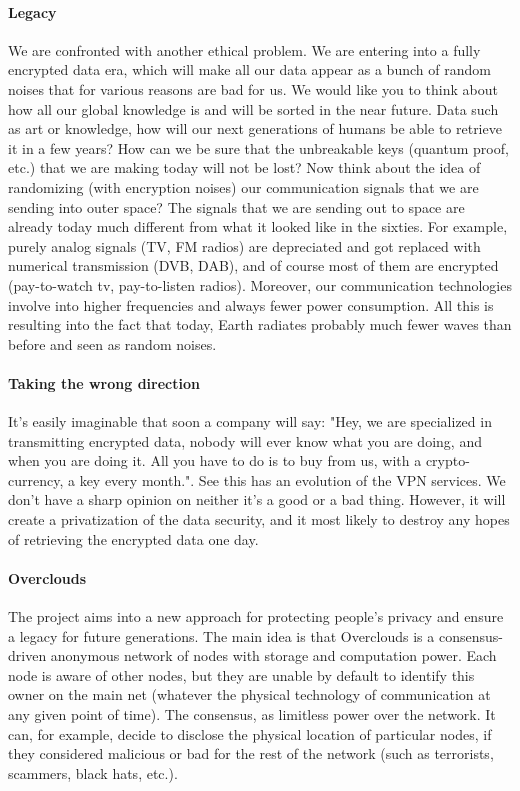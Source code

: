 \paragraph{Legacy} We are confronted with another ethical problem. We are entering into a fully encrypted data era, which will make all our data appear as a bunch of random noises that for various reasons are bad for us. We would like you to think about how all our global knowledge is and will be sorted in the near future. Data such as art or knowledge, how will our next generations of humans be able to retrieve it in a few years? How can we be sure that the unbreakable keys (quantum proof, etc.) that we are making today will not be lost?
Now think about the idea of randomizing (with encryption noises) our communication signals that we are sending into outer space? The signals that we are sending out to space are already today much different from what it looked like in the sixties. For example, purely analog signals (TV, FM radios) are depreciated and got replaced with numerical transmission (DVB, DAB), and of course most of them are encrypted (pay-to-watch tv, pay-to-listen radios). Moreover, our communication technologies involve into higher frequencies and always fewer power consumption. All this is resulting into the fact that today, Earth radiates probably much fewer waves than before and seen as random noises.

\paragraph{Taking the wrong direction} It's easily imaginable that soon a company will say: "Hey, we are specialized in transmitting encrypted data, nobody will ever know what you are doing, and when you are doing it. All you have to do is to buy from us, with a crypto-currency, a key every month.". See this has an evolution of the VPN services. We don't have a sharp opinion on neither it's a good or a bad thing. However, it will create a privatization of the data security, and it most likely to destroy any hopes of retrieving the encrypted data one day.

\paragraph{Overclouds} The project aims into a new approach for protecting people's privacy and ensure a legacy for future generations.
The main idea is that Overclouds is a consensus-driven anonymous network of nodes with storage and computation power. Each node is aware of other nodes, but they are unable by default to identify this owner on the main net (whatever the physical technology of communication at any given point of time). The consensus, as limitless power over the network. It can, for example, decide to disclose the physical location of particular nodes, if they considered malicious or bad for the rest of the network (such as terrorists, scammers, black hats, etc.).

